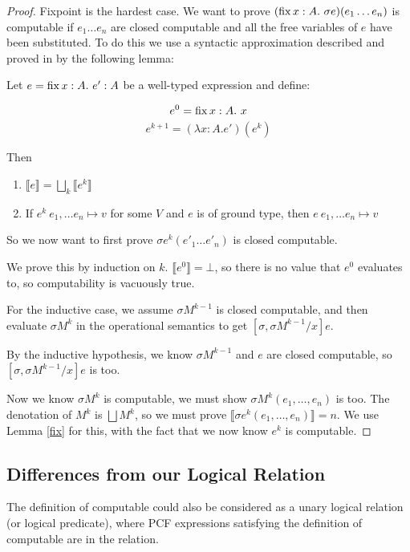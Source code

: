 \begin{proof}
Fixpoint is the hardest case. We want to prove $(\operatorname{fix} x:A. \ \sigma e)(e_1 \dots e_n)$ is computable if $e_1 \dots e_n$ are closed computable and all the free variables of $e$ have been substituted. To do this we use a syntactic approximation described and proved in \citep{Gunter92} by the following lemma:

\begin{lem}\label{fix}
Let $e = \operatorname{fix} x : A. \ e' : A$ be a well-typed expression and define:

\[e^0 = \operatorname{fix} x : A. \ x \]
\[ e^{k+1} = (\lambda x : A. e')(e^k) \]

Then 

\begin{enumerate}
\item{$\llbracket e \rrbracket = \bigsqcup_k \llbracket e^k \rrbracket$}
\item{If $e^k \ e_1, \dots e_n \mapsto v$ for some $V$ and $e$ is of ground type, then $e \ e_1, \dots e_n \mapsto v$} 
\end{enumerate}  
\end{lem}

So we now want to first prove $\sigma e^k (e'_1 \dots e'_n)$ is closed computable.

We prove this by induction on $k$. $\llbracket e^0 \rrbracket = \bot$, so there is no value that $e^0$ evaluates to, so computability is vacuously true.

For the inductive case, we assume $\sigma M^{k-1}$ is closed computable, and then evaluate $\sigma M^k$ in the operational semantics to get $[\sigma, \sigma M^{k-1}/x]e$.

By the inductive hypothesis, we know $\sigma  M^{k-1}$ and $e$ are closed computable, so    $[\sigma, \sigma M^{k-1}/x]e$ is too.

Now we know $\sigma M^k$ is computable, we must show $\sigma M^k (e_1, \dots, e_n)$ is too. The denotation of $M^k$ is $\bigsqcup M^k$, so we must prove $\llbracket \sigma e^k (e_1, \dots, e_n)\rrbracket = n$. We use Lemma \ref{fix} for this, with the fact that we now know $e^k$ is computable.
\end{proof}

\subsection{Differences from our Logical Relation}
The definition of computable could also be considered as a unary logical relation (or logical predicate), where PCF expressions satisfying the definition of computable are in the relation.


